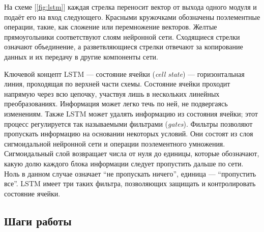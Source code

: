 \documentclass[14pt]{extarticle}
\begin{document}
На схеме [\ref{fig:lstm}] каждая стрелка переносит вектор от выхода одного модуля и подаёт его на вход следующего. Красными кружочками обозначены поэлементные операции, такие, как сложение или перемножение векторов. Желтые прямоугольники соответствуют слоям нейронной сети. Сходящиеся стрелки означают объединение, а разветвляющиеся стрелки отвечают за копирование данных и их передачу в другие компоненты сети.

Ключевой концепт LSTM --- состояние ячейки ({\it cell state}) --- горизонтальная линия, проходящая по верхней части схемы. Состояние ячейки проходит напрямую через всю цепочку, участвуя лишь в нескольких линейных преобразованиях. Информация может легко течь по ней, не подвергаясь изменениям. Также LSTM может удалять информацию из состояния ячейки; этот процесс регулируется так называемыми фильтрами ({\it gates}). Фильтры позволяют пропускать информацию на основании некоторых условий. Они состоят из слоя сигмоидальной нейронной сети и операции поэлементного умножения. Сигмоидальный слой возвращает числа от нуля до единицы, которые обозначают, какую долю каждого блока информации следует пропустить дальше по сети. Ноль в данном случае означает “не пропускать ничего”, единица --- “пропустить все”. LSTM имеет три таких фильтра, позволяющих защищать и контролировать состояние ячейки.


\subsection{Шаги работы}
\end{document}
